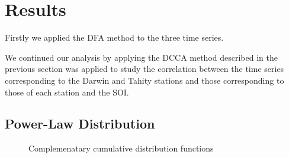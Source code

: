 \documentclass[onecolumn, preprint,aps,amsmath, amssymb, superscriptaddress]{revtex4}
\begin{document}
\section{Results}
\label{resultados}


Firstly we applied the DFA method to the three time series.




We continued our analysis by applying the DCCA method described in the previous section was applied to study the correlation between the time series corresponding to the Darwin and Tahity stations and those corresponding to those of each station and the SOI.

\subsection{Power-Law Distribution}

\begin{figure}
\caption{Complemenatary cumulative distribution functions}
\label{fig:ccdf}
\end{figure}
\end{document}
